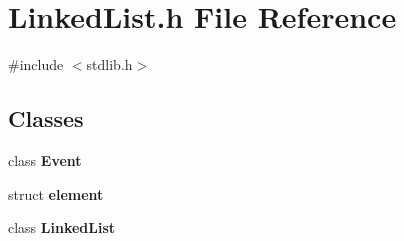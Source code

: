 \section{Linked\+List.\+h File Reference}
\label{LinkedList_8h}
{\ttfamily \#include $<$stdlib.\+h$>$}\newline
\subsection*{Classes}
\begin{DoxyCompactItemize}
\item 
class \textbf{ Event}
\item 
struct \textbf{ element}
\item 
class \textbf{ Linked\+List}
\end{DoxyCompactItemize}
